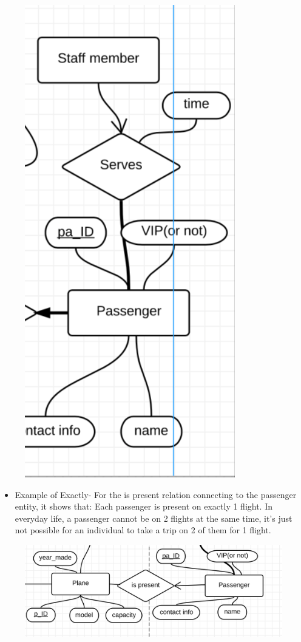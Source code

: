 \documentclass[10pt,conference]{IEEEtran}
\begin{document}
\begin{figure}
\centering
\includegraphics[scale=0.5]{at_most.png}
\end{figure}



\newpage\begin{itemize} \item{
Example of Exactly-  For the is present relation connecting to the passenger entity, it shows that: Each passenger is present on exactly 1 flight. In everyday life, a passenger cannot be on 2 flights at the same time, it's just not possible for an individual to take a trip on 2 of them for 1 flight.} \end{itemize} 

\begin{figure}
\centering
\includegraphics[width=.50\textwidth]{exactlyOne.png}
\end{figure}
\end{document}
